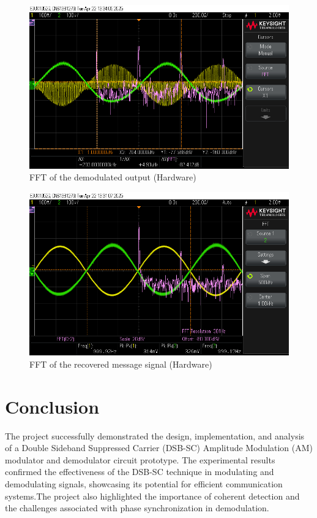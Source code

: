 \documentclass[conference]{IEEEtran}
\begin{document}
\begin{figure}
    \centering
    \includegraphics[width=1\linewidth]{Images/demodulated_output_fft.png}
    \caption{FFT of the demodulated output (Hardware)}
\end{figure}

\begin{figure}
    \centering
    \includegraphics[width=1\linewidth]{Images/recovered_message_fft.png}
    \caption{FFT of the recovered message signal (Hardware)}
\end{figure}

\section{Conclusion}
The project successfully demonstrated the design, implementation, and analysis of a Double Sideband Suppressed Carrier (DSB-SC) Amplitude Modulation (AM) modulator and demodulator circuit prototype. The experimental results confirmed the effectiveness of the DSB-SC technique in modulating and demodulating signals, showcasing its potential for efficient communication systems.The project also highlighted the importance of coherent detection and the challenges associated with phase synchronization in demodulation.
\end{document}
